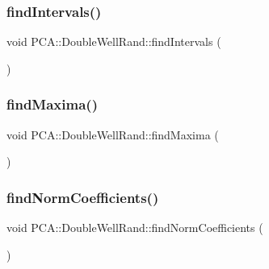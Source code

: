 \subsubsection{\texorpdfstring{find\+Intervals()}{findIntervals()}}
{\footnotesize\ttfamily void P\+C\+A\+::\+Double\+Well\+Rand\+::find\+Intervals (\begin{DoxyParamCaption}{ }\end{DoxyParamCaption})\hspace{0.3cm}{\ttfamily [private]}}

\hypertarget{class_p_c_a_1_1_double_well_rand_aa798efa59786f8aeeafb198f4a3319a3}{}\label{class_p_c_a_1_1_double_well_rand_aa798efa59786f8aeeafb198f4a3319a3} 
\subsubsection{\texorpdfstring{find\+Maxima()}{findMaxima()}}
{\footnotesize\ttfamily void P\+C\+A\+::\+Double\+Well\+Rand\+::find\+Maxima (\begin{DoxyParamCaption}{ }\end{DoxyParamCaption})\hspace{0.3cm}{\ttfamily [private]}}

\hypertarget{class_p_c_a_1_1_double_well_rand_ab4d8dfc2a37b647e55fd18cc1d8e11f9}{}\label{class_p_c_a_1_1_double_well_rand_ab4d8dfc2a37b647e55fd18cc1d8e11f9} 
\subsubsection{\texorpdfstring{find\+Norm\+Coefficients()}{findNormCoefficients()}}
{\footnotesize\ttfamily void P\+C\+A\+::\+Double\+Well\+Rand\+::find\+Norm\+Coefficients (\begin{DoxyParamCaption}{ }\end{DoxyParamCaption})\hspace{0.3cm}{\ttfamily [private]}}

\hypertarget{class_p_c_a_1_1_double_well_rand_ab3817725d51a9171ef6a7e6a72ce25ef}{}\label{class_p_c_a_1_1_double_well_rand_ab3817725d51a9171ef6a7e6a72ce25ef} 
